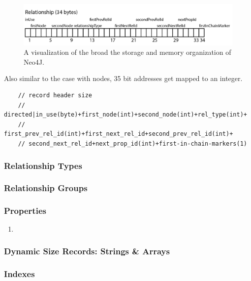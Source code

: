 \documentclass[a4paper,10pt]{article}
\begin{document}
    \begin{figure}[htp]\label{rel_layout}
        \begin{center}
            \includegraphics[keepaspectratio,width=\textwidth]{img/relationship_layout.png}
        \end{center}
        \caption{A visualization of the broad the storage and memory organization of Neo4J.} %
    \end{figure}
    Also similar to the case with nodes, 35 bit addresses get mapped to an integer.
    \begin{verbatim}
    // record header size
    // directed|in_use(byte)+first_node(int)+second_node(int)+rel_type(int)+
    // first_prev_rel_id(int)+first_next_rel_id+second_prev_rel_id(int)+
    // second_next_rel_id+next_prop_id(int)+first-in-chain-markers(1)
    \end{verbatim}
    
    \subsubsection{Relationship Types}
    \subsubsection{Relationship Groups}

    \subsubsection{Properties}
    \begin{enumerate}
     \item 
    \end{enumerate}
    
    \subsubsection{Dynamic Size Records: Strings \& Arrays}
    
    \subsubsection{Indexes}
    
\end{document}
